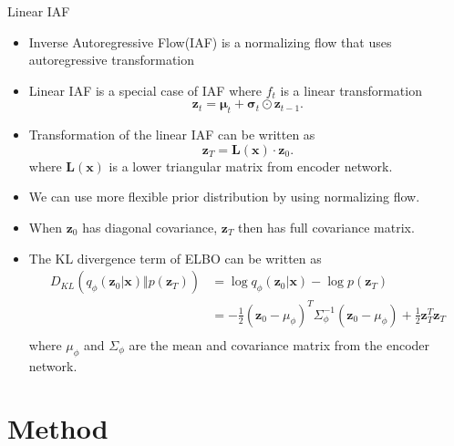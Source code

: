 \documentclass{beamer}
\begin{document}
\begin{frame}[allowframebreaks]{Linear IAF}
    \begin{itemize}
        \item Inverse Autoregressive Flow(IAF) is a normalizing flow that uses autoregressive transformation \cite{kingma2016iaf}
        \item Linear IAF is a special case of IAF where $f_t$ is a linear transformation
        \begin{equation*}
            \mathbf z_t = \mathbf \mu_t + \mathbf \sigma_t \odot \mathbf z_{t-1}.
        \end{equation*}
        \item Transformation of the linear IAF can be written as
        \begin{equation*}
            \mathbf{z}_T = \mathbf{L(x)} \cdot \mathbf{z}_0.
        \end{equation*}
        where $\mathbf{L(x)}$ is a lower triangular matrix from encoder network.
        \item We can use more flexible prior distribution by using normalizing flow.
        \item When $\mathbf z_0$ has diagonal covariance, $\mathbf z_T$ then has full covariance matrix.
        \item The KL divergence term of ELBO can be written as
        \begin{equation*}
            \begin{aligned}
                D_{KL}(q_\phi(\mathbf{z}_0 | \mathbf{x}) \Vert p(\mathbf{z}_T)) &=
                \log q_\phi(\mathbf{z}_0 | \mathbf{x}) - \log p(\mathbf{z}_T) \\
                &= -\frac{1}{2}(\mathbf{z}_0 -\mu_\phi)^T\Sigma_\phi^{-1}(\mathbf{z}_0 -\mu_\phi) + \frac{1}{2}\mathbf{z}_T^T\mathbf{z}_T \\
            \end{aligned}
        \end{equation*}
        where $\mu_\phi$ and $\Sigma_\phi$ are the mean and covariance matrix from the encoder network.
    \end{itemize}
\end{frame}

\section{Method}
\end{document}
